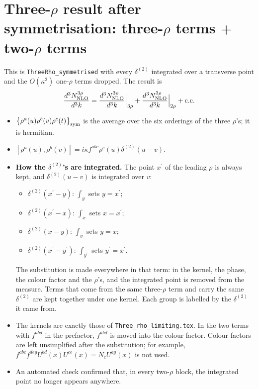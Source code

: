 \documentclass[10pt]{article}
\numberwithin{equation}{section}
\begin{document}
\section*{Three-$\rho$ result after symmetrisation: three-$\rho$ terms $+$ two-$\rho$ terms}
\noindent This is \texttt{ThreeRho\_symmetrised} with every $\delta^{(2)}$ integrated over a transverse point and the $O(\kappa^{2})$ one-$\rho$ terms dropped. The result is
\begin{equation}
\frac{d^{3}N^{3\rho}_{\rm NLO}}{d^{3}k}=\frac{d^{3}N^{3\rho}_{\rm NLO}}{d^{3}k}\Big|_{3\rho}+\frac{d^{3}N^{3\rho}_{\rm NLO}}{d^{3}k}\Big|_{2\rho}+{\rm c.c.}
\end{equation}
\begin{itemize}
\item $\big\{\rho^{a}(u)\rho^{b}(v)\rho^{c}(t)\big\}_{\rm sym}$ is the average over the six orderings of the three $\rho$'s; it is hermitian.
\item $[\rho^{a}(u),\rho^{b}(v)]=i\kappa f^{abc}\rho^{c}(u)\delta^{(2)}(u-v)$.
\item \textbf{How the $\delta^{(2)}$'s are integrated.} The point $x^{\prime}$ of the leading $\rho$ is always kept, and $\delta^{(2)}(u-v)$ is integrated over $v$:
\begin{itemize}
\item $\delta^{(2)}(x^{\prime}-y)$: $\int_{y}$ sets $y=x^{\prime}$;
\item $\delta^{(2)}(x^{\prime}-x)$: $\int_{x}$ sets $x=x^{\prime}$;
\item $\delta^{(2)}(x-y)$: $\int_{y}$ sets $y=x$;
\item $\delta^{(2)}(x^{\prime}-y^{\prime})$: $\int_{y^{\prime}}$ sets $y^{\prime}=x^{\prime}$.
\end{itemize}
The substitution is made everywhere in that term: in the kernel, the phase, the colour factor and the $\rho$'s, and the integrated point is removed from the measure. Terms that come from the same three-$\rho$ term and carry the same $\delta^{(2)}$ are kept together under one kernel. Each group is labelled by the $\delta^{(2)}$ it came from.
\item The kernels are exactly those of \texttt{Three\_rho\_limiting.tex}. In the two terms with $f^{abd}$ in the prefactor, $f^{abd}$ is moved into the colour factor. Colour factors are left unsimplified after the substitution; for example, $f^{abc}f^{deg}U^{bd}(x)U^{ce}(x)=N_{c}U^{ag}(x)$ is not used.
\item An automated check confirmed that, in every two-$\rho$ block, the integrated point no longer appears anywhere.
\end{itemize}
\end{document}
